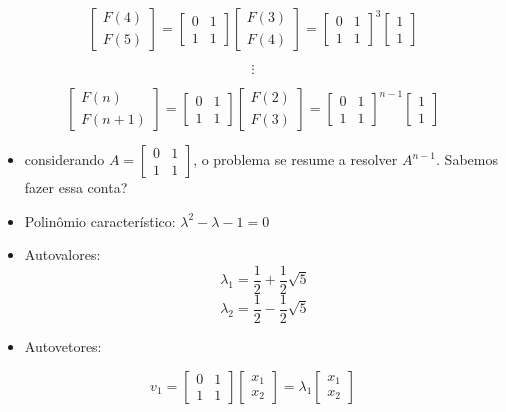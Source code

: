 \documentclass[
  letterpaper,
  DIV=11,
  numbers=noendperiod]{scrartcl}
\begin{document}
\begin{tcolorbox}
\[ \begin{bmatrix}F(4) \\ F(5)\end{bmatrix} = \begin{bmatrix}0 & 1 \\1 & 1\end{bmatrix} \begin{bmatrix}F(3) \\ F(4)\end{bmatrix} = \begin{bmatrix}0 & 1 \\1 & 1\end{bmatrix}^{3} \begin{bmatrix}1 \\ 1\end{bmatrix}\]

\[\vdots\]

\[ \begin{bmatrix}F(n) \\ F(n+1)\end{bmatrix} = \begin{bmatrix}0 & 1 \\1 & 1\end{bmatrix} \begin{bmatrix}F(2) \\ F(3)\end{bmatrix}= \begin{bmatrix}0 & 1 \\1 & 1\end{bmatrix}^{n-1} \begin{bmatrix}1 \\ 1\end{bmatrix}\]

\begin{itemize}
\item
  considerando \(A = \begin{bmatrix}0 & 1 \\ 1 & 1\end{bmatrix}\), o
  problema se resume a resolver \(A^{n-1}\). Sabemos fazer essa conta?
\item
  Polinômio característico: \(\lambda^2 - \lambda -1=0\)
\item
  Autovalores: \[\lambda_1=\frac{1}{2} + \frac{1}{2}\sqrt{5}\]
  \[\lambda_2=\frac{1}{2} - \frac{1}{2}\sqrt{5}\]
\item
  Autovetores:
\end{itemize}

\[v_1 = \begin{bmatrix}0 & 1 \\1 & 1\end{bmatrix} \begin{bmatrix}x_1 \\ x_2\end{bmatrix} = \lambda_1\begin{bmatrix}x_1 \\ x_2\end{bmatrix}\]


\end{tcolorbox}
\end{document}
